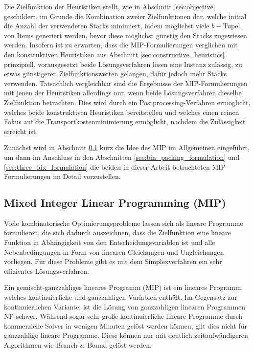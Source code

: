 Die Zielfunktion der Heuristiken stellt, wie in Abschnitt \ref{sec:objective} geschildert, im Grunde die Kombination
zweier Zielfunktionen dar, welche initial die Anzahl der verwendeten Stacks minimiert, indem möglichst viele
$b-$Tupel von Items generiert werden, bevor diese möglichst günstig den Stacks zugewiesen werden.
Insofern ist zu erwarten, dass die MIP-Formulierungen verglichen mit den konstruktiven Heuristiken
aus Abschnitt \ref{sec:constructive_heuristics} prinzipiell, vorausgesetzt beide Lösungsverfahren lösen eine
Instanz zulässig, zu etwas günstigeren Zielfunktionswerten gelangen, dafür jedoch mehr Stacks verwenden.
Tatsächlich vergleichbar sind die Ergebnisse der MIP-Formulierungen mit jenen der Heuristiken allerdings nur,
wenn beide Lösungsverfahren dieselbe Zielfunktion betrachten. Dies wird durch ein Postprocessing-Verfahren
ermöglicht, welches beide konstruktiven Heuristiken bereitstellen und welches einen reinen Fokus auf die
Transportkostenminimierung ermöglicht, nachdem die Zulässigkeit erreicht ist.

Zunächst wird in Abschnitt \ref{sec:mip_definition} kurz die Idee des MIP im Allgemeinen
eingeführt, um dann im Anschluss in den Abschnitten \ref{sec:bin_packing_formulation} und \ref{sec:three_idx_formulation} die beiden in dieser Arbeit betrachteten MIP-Formulierungen im Detail vorzustellen.

\subsection{Mixed Integer Linear Programming (MIP)}
\label{sec:mip_definition}

Viele kombinatorische Optimierungsprobleme lassen sich als lineare Programme formulieren, die sich dadurch
auszeichnen, dass die Zielfunktion eine lineare Funktion in Abhängigkeit von den Entscheidungsvariablen ist
und alle Nebenbedingungen in Form von linearen Gleichungen und Ungleichungen vorliegen. Für diese Probleme gibt es mit dem Simplexverfahren ein sehr effizientes Lösungsverfahren.\cite{Knust2017}

Ein gemischt-ganzzahliges lineares Programm (MIP) ist ein lineares Programm, welches kontinuierliche und ganzzahligen Variablen
enthält. Im Gegensatz zur kontinuierlichen Variante, ist die Lösung von ganzzahligen linearen Programmen NP-schwer.
Während sogar sehr große kontinuierliche lineare Programme durch kommerzielle Solver in wenigen Minuten gelöst werden können, gilt dies nicht für ganzzahlige lineare Programme. Diese können nur mit deutlich zeitaufwändigeren Algorithmen wie Branch \& Bound gelöst werden.\cite{Brucker2006}


